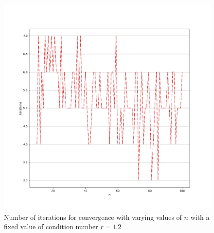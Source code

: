 \documentclass[11pt]{article}
\begin{document}
\begin{figure}[!htbp]
    \includegraphics[width=\textwidth]{./niter_fix_r_good.png}
    \caption{Number of iterations for convergence with varying values of $n$
    with a fixed value of condition number $r=1.2$\label{fig:good}}
\end{figure}
\end{document}
